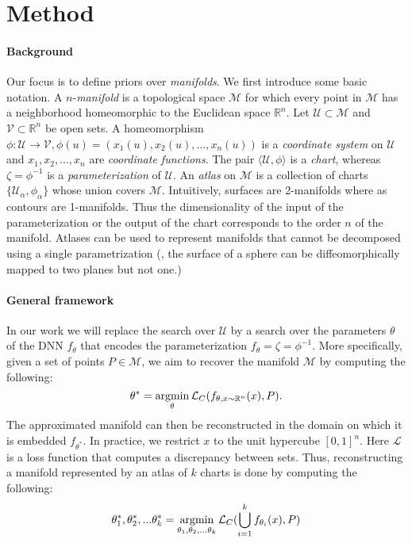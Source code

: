 \section{Method}\label{dmp:method}

\paragraph*{Background} Our focus is to define priors over \emph{manifolds}.
We first introduce some basic notation.
A $n$-\emph{manifold} is a topological space $\mathcal{M}$ for which
every point in $\mathcal{M}$ has a neighborhood homeomorphic to the
Euclidean space $\mathbb{R}^n$.
Let $\mathcal{U} \subset \mathcal{M}$ and $\mathcal{V} \subset \mathbb{R}^n$ be open
sets.
A homeomorphism $\phi: \mathcal{U} \rightarrow \mathcal{V}, \phi(u) =
(x_1(u), x_2(u), ..., x_n(u))$ is a \emph{coordinate system} on
$\mathcal{U}$ and $x_1, x_2, ..., x_n$ are \emph{coordinate functions}.
The pair $\langle \mathcal{U}, \phi \rangle$ is a \emph{chart},
whereas $\zeta=\phi^{-1}$ is a \emph{parameterization} of $\mathcal{U}$.
An \emph{atlas} on $\mathcal{M}$ is a collection of charts
$\{\mathcal{U}_\alpha, \phi_\alpha\}$ whose union covers
$\mathcal{M}$. Intuitively, surfaces are 2-manifolds where as contours are 1-manifolds.
Thus the dimensionality of the input of the parameterization or the
output of the chart corresponds to the order $n$ of the manifold.
Atlases can be used to represent manifolds that cannot be decomposed
using a single parametrization (\eg, the surface of a sphere can be
diffeomorphically mapped to two planes but not one.)

\paragraph*{General framework}
In our work we will replace the search over $\mathcal{U}$ by a search over
the parameters $\theta$ of the DNN $f_\theta$ that encodes the parameterization $f_\theta=\zeta=\phi^{-1}$.
More specifically, given a set of points $P \in \mathcal{M}$, we aim to recover the manifold $\mathcal{M}$ by computing the following:
\begin{equation}
    \theta^* = \operatorname*{argmin}_\theta \mathcal{L}_C(f_{\theta, x \sim \mathbb{R}^n}(x), P).
\end{equation}
The approximated manifold can then be reconstructed in the domain on which it is embedded $f_{\theta^*}$.
In practice, we restrict $x$ to the unit hypercube $[0, 1]^n$.
Here $\mathcal{L}$ is a loss function that computes a discrepancy between sets.
Thus, reconstructing a manifold represented by an atlas of $k$ charts is done by computing the following: 
\begin{equation}
    \theta_1^*, \theta_2^*, ... \theta_k^* = \operatorname*{argmin}_{\theta_1, \theta_2, ... \theta_k} \mathcal{L}_C(\bigcup\limits_{i=1}^{k} f_{\theta_i}(x), P)
\end{equation}

